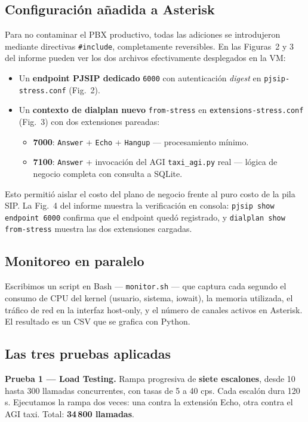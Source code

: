\documentclass[11pt]{article}
\begin{document}
\subsection*{Configuraci\'on a\~nadida a Asterisk}
Para no contaminar el PBX productivo, todas las adiciones se introdujeron mediante directivas \texttt{\#include}, completamente reversibles. En las Figuras~2 y 3 del informe pueden ver los dos archivos efectivamente desplegados en la VM:
\begin{itemize}[leftmargin=*,itemsep=2pt]
  \item Un \textbf{endpoint PJSIP dedicado} \texttt{6000} con autenticaci\'on \textit{digest} en \texttt{pjsip-stress.conf} (Fig.~2).
  \item Un \textbf{contexto de dialplan nuevo} \texttt{from-stress} en \texttt{extensions-stress.conf} (Fig.~3) con dos extensiones pareadas:
  \begin{itemize}[leftmargin=*]
    \item \textbf{7000}: \texttt{Answer} + \texttt{Echo} + \texttt{Hangup} --- procesamiento m\'inimo.
    \item \textbf{7100}: \texttt{Answer} + invocaci\'on del AGI \texttt{taxi\_agi.py} real --- l\'ogica de negocio completa con consulta a SQLite.
  \end{itemize}
\end{itemize}
Esto permiti\'o aislar el costo del plano de negocio frente al puro costo de la pila SIP. La Fig.~4 del informe muestra la verificaci\'on en consola: \texttt{pjsip show endpoint 6000} confirma que el endpoint qued\'o registrado, y \texttt{dialplan show from-stress} muestra las dos extensiones cargadas.

\subsection*{Monitoreo en paralelo}
Escribimos un script en Bash --- \texttt{monitor.sh} --- que captura cada segundo el consumo de CPU del kernel (usuario, sistema, iowait), la memoria utilizada, el tr\'afico de red en la interfaz host-only, y el n\'umero de canales activos en Asterisk. El resultado es un CSV que se grafica con Python.

\subsection*{Las tres pruebas aplicadas}

\textbf{Prueba 1 --- Load Testing.} Rampa progresiva de \textbf{siete escalones}, desde 10 hasta 300 llamadas concurrentes, con tasas de 5 a 40 cps. Cada escal\'on dura 120\,s. Ejecutamos la rampa dos veces: una contra la extensi\'on Echo, otra contra el AGI taxi. Total: \textbf{34\,800 llamadas}.
\end{document}
